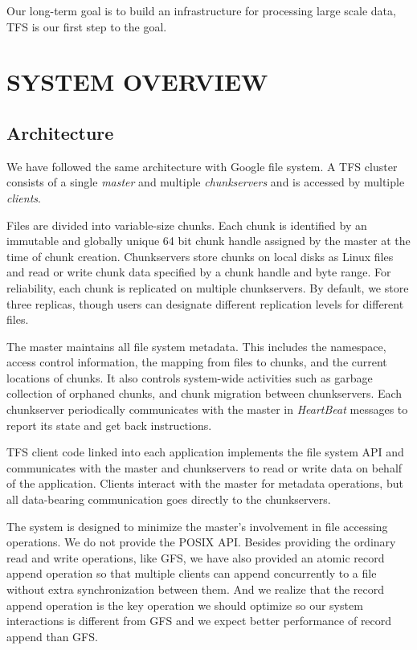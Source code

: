 \documentclass[letterpaper,twocolumn,10pt]{article}
\begin{document}
Our long-term goal is to build an infrastructure for processing large scale data, TFS is our first step to the goal.
\section{SYSTEM OVERVIEW}
\subsection{Architecture}
We have followed the same architecture with Google file system. A TFS cluster consists of a single \emph{master} and multiple \emph{chunkservers} and is accessed by multiple \emph{clients}. 

Files are divided into variable-size chunks. Each chunk is identified by an immutable and globally unique 64 bit chunk handle assigned by the master at the time of chunk creation. Chunkservers store chunks on local disks as Linux files and read or write chunk data specified by a chunk handle and byte range. For reliability, each chunk is replicated on multiple chunkservers. By default, we store three replicas, though users can designate different replication levels for different files.

The master maintains all file system metadata. This includes the namespace, access control information, the mapping from files to chunks, and the current locations of chunks. It also controls system-wide activities such as garbage collection of orphaned chunks, and chunk migration between chunkservers. Each chunkserver periodically communicates with the master in \emph{HeartBeat} messages to report its state and get back instructions. 

TFS client code linked into each application implements the file system API and communicates with the master and chunkservers to read or write data on behalf of the application. Clients interact with the master for metadata operations, but all data-bearing communication goes directly to the chunkservers. 

The system is designed to minimize the master's involvement in file accessing operations. We do not provide the POSIX API. Besides providing the ordinary read and write operations, like GFS, we have also provided an atomic record append operation so that multiple clients can append concurrently to a file without extra synchronization between them. And we realize that the record append operation is the key operation we should optimize so our system interactions is different from GFS and we expect better performance of record append than GFS. 
\end{document}
